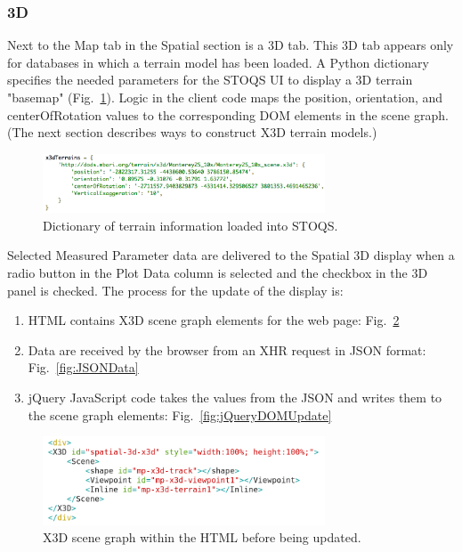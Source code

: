 \documentclass[conference]{IEEEtran}
\begin{document}
\subsubsection{3D}
Next to the Map tab in the Spatial section is a 3D tab. This 3D tab appears only for databases in which a terrain model has been loaded. A Python dictionary specifies the needed parameters for the STOQS UI to display a 3D terrain "basemap" (Fig.~\ref{fig:x3dTerrains}). Logic in the client code maps the position, orientation, and centerOfRotation values to the corresponding DOM elements in the scene graph. (The next section describes ways to construct X3D terrain models.)

\begin{figure}[htbp]
\centering
\includegraphics[width=3.3in]{x3dTerrains.png}
\caption{Dictionary of terrain information loaded into STOQS.}
\label{fig:x3dTerrains}
\end{figure}

Selected Measured Parameter data are delivered to the Spatial 3D display when a radio button in the Plot Data column is selected and the checkbox in the 3D panel is checked. The process for the update of the display is:

\begin{enumerate}
\item HTML contains X3D scene graph elements for the web page: Fig.~\ref{fig:Spatial3D_DOM}
\item Data are received by the browser from an XHR request in JSON format: Fig.~\ref{fig:JSONData}
\item jQuery JavaScript code takes the values from the JSON and writes them to the scene graph elements: Fig.~\ref{fig:jQueryDOMUpdate}
\end{enumerate}

\begin{figure}[!htbp]
\centering
\includegraphics[width=3.3in]{Spatial3D_DOM.png}
\caption{X3D scene graph within the HTML before being updated.}
\label{fig:Spatial3D_DOM}
\end{figure}
\end{document}
